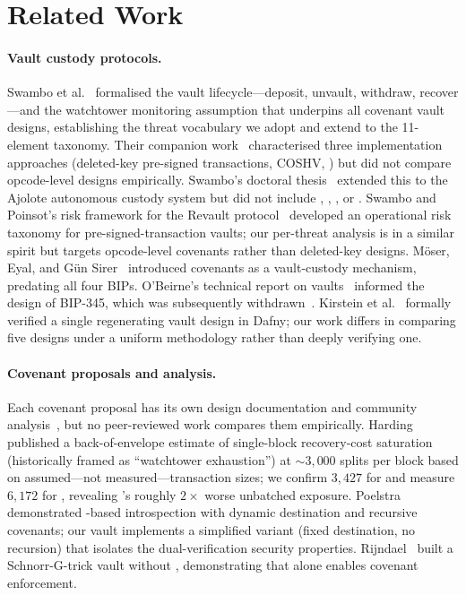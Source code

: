 
\section{Related Work}
\label{sec:related}

\paragraph{Vault custody protocols.}
Swambo et al.~\cite{SHMB20} formalised the vault lifecycle---deposit,
unvault, withdraw, recover---and the watchtower monitoring assumption
that underpins all covenant vault designs, establishing the threat
vocabulary we adopt and extend to the 11-element taxonomy. Their
companion work~\cite{SBMB20} characterised three implementation
approaches (deleted-key pre-signed transactions, COSHV, \opctv{}) but
did not compare opcode-level designs empirically. Swambo's doctoral
thesis~\cite{Swa23} extended this to the Ajolote autonomous custody
system but did not include \opctv{}, \opccv{}, \opvault{}, or
\catcsfs{}. Swambo and Poinsot's risk framework for the Revault
protocol~\cite{SP21} developed an operational risk taxonomy for
pre-signed-transaction vaults; our per-threat analysis is in a
similar spirit but targets opcode-level covenants rather than
deleted-key designs. Möser, Eyal, and Gün Sirer~\cite{MES16}
introduced covenants as a vault-custody mechanism, predating all
four BIPs. O'Beirne's technical report on vaults~\cite{OBeirne23}
informed the design of BIP-345, which was subsequently
withdrawn~\cite{OB25}. Kirstein et al.~\cite{KLGZ21} formally
verified a single regenerating vault design in Dafny; our work
differs in comparing five designs under a uniform methodology
rather than deeply verifying one.

\paragraph{Covenant proposals and analysis.}
Each covenant proposal has its own design documentation and
community analysis~\cite{BIP119,BIP443,BIP345,BIP347,BIP348}, but no
peer-reviewed work compares them empirically. Harding~\cite{Har24}
published a back-of-envelope estimate of \opvault{} single-block
recovery-cost saturation (historically framed as ``watchtower
exhaustion'') at ${\sim}3{,}000$ splits per block based on
assumed---not measured---transaction sizes; we confirm $3{,}427$ for
\opvault{} and measure $6{,}172$ for \opccv{}, revealing \opccv{}'s
roughly $2\times$ worse unbatched exposure. Poelstra~\cite{Poe21}
demonstrated \opcat{}-based introspection with dynamic destination
and recursive covenants; our \catcsfs{} vault implements a
simplified variant (fixed destination, no recursion) that isolates
the dual-verification security properties. Rijndael~\cite{Rij24}
built a Schnorr-G-trick vault without \opcsfs{}, demonstrating that
\opcat{} alone enables covenant enforcement.

